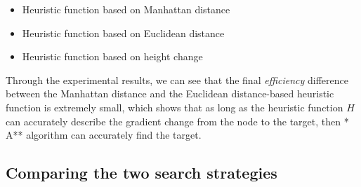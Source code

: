 \documentclass[
]{article}
\begin{document}
\begin{itemize}
\item
  Heuristic function based on Manhattan distance
\item
  Heuristic function based on Euclidean distance
\item
  Heuristic function based on height change
\end{itemize}

Through the experimental results, we can see that the final
\emph{efficiency} difference between the Manhattan distance and the
Euclidean distance-based heuristic function is extremely small, which
shows that as long as the heuristic function \(H\) can accurately
describe the gradient change from the node to the target, then * A**
algorithm can accurately find the target.

\hypertarget{header-n463}{%
\subsection{Comparing the two search strategies}\label{header-n463}}
\end{document}
